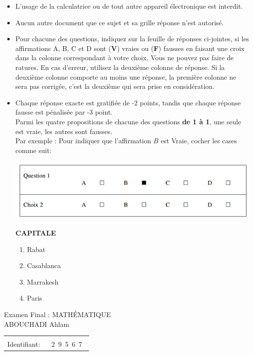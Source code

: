\documentclass{book}%
\begin{document}
\begin{itemize}%
\item%
L'usage de la calculatrice ou de tout autre appareil électronique est interdit.%
\item%
Aucun autre document que ce sujet et sa grille réponse n'est autorisé.%
\item%
Pour chacune des questions, indiquez sur la feuille de réponses ci-jointes, si les affirmations A, B, C et D sont (\textbf{V}) vraies ou (\textbf{F}) fausses en faisant une croix dans la colonne correspondant à votre choix. Vous ne pouvez pas faire de ratures. En cas d'erreur, utilisez la deuxième colonne de réponse. Si la deuxième colonne comporte au moins une réponse, la première colonne ne sera pas corrigée, c'est la deuxième qui sera prise en considération.%
\item%
Chaque réponse exacte est gratifiée de -2 points, tandis que chaque réponse fausse est pénalisée par -3 point. \\ 	Parmi les quatre propositions de chacune des questions \textbf{de 1 à 1}, une seule est vraie, les autres sont fausses. \\ 	Par exemple : Pour indiquer que l'affirmation $B$ est Vraie, cocher les cases comme suit:  \\ \begin{center}	\includegraphics[scale=0.8]{reponses.png} \end{center}%
\thispagestyle{empty}%
\begin{exercise}%
\textbf{CAPITALE }%
\begin{enumerate}[label=\textbf{\Alph*. }]%
\item%
Rabat%
\item%
Casablanca%
\item%
Marrakesh%
\item%
Paris%
\end{enumerate}%
\end{exercise}%
\end{itemize}%
\newpage%
\thispagestyle{empty}%
Examen Final : MATHÉMATIQUE $\qquad \qquad \qquad \qquad \qquad \qquad \qquad \qquad$ ABOUCHADI Ahlam%
\begin{flushright}%
\begin{tabular}{|l|}%
\hline%
 \\%
\thispagestyle{empty}%
Identifiant: $\quad$ {\Large 2~9~5~6~7~}%
 \\%
\hline%
\end{tabular}%
\end{flushright}%
\end{document}

